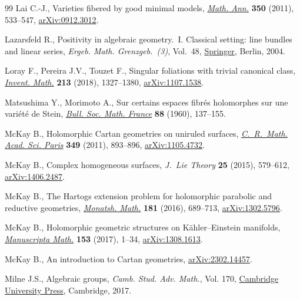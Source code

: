 \documentclass[11pt]{article}
\numberwithin{equation}{section}
\numberwithin{equation}{section}
\begin{document}
\begin{thebibliography}{99}
Lai C.-J., Varieties fibered by good minimal models, \href{https://doi.org/10.1007/s00208-010-0574-7}{\textit{Math. Ann.}}
 \textbf{350} (2011), 533--547, \href{https://arxiv.org/abs/0912.3012}{arXiv:0912.3012}.

Lazarsfeld R., Positivity in algebraic geometry.~{I}. {C}lassical setting: line
 bundles and linear series, \textit{Ergeb. Math. Grenzgeb.~(3)}, Vol.~48,
 \href{https://doi.org/10.1007/978-3-642-18808-4}{Springer}, Berlin, 2004.

Loray F., Pereira J.V., Touzet F., Singular foliations with trivial canonical
 class, \href{https://doi.org/10.1007/s00222-018-0806-0}{\textit{Invent. Math.}} \textbf{213} (2018), 1327--1380,
 \href{https://arxiv.org/abs/1107.1538}{arXiv:1107.1538}.

Matsushima Y., Morimoto A., Sur certains espaces fibr\'es holomorphes sur une
 vari\'et\'e de {S}tein, \href{https://doi.org/10.24033/bsmf.1548}{\textit{Bull. Soc. Math. France}} \textbf{88} (1960),
 137--155.

McKay B., Holomorphic {C}artan geometries on uniruled surfaces,
 \href{https://doi.org/10.1016/j.crma.2011.07.021}{\textit{C.~R.~Math. Acad. Sci. Paris}} \textbf{349} (2011), 893--896,
 \href{https://arxiv.org/abs/1105.4732}{arXiv:1105.4732}.

McKay B., Complex homogeneous surfaces, \textit{J.~Lie Theory} \textbf{25}
 (2015), 579--612, \href{https://arxiv.org/abs/1406.2487}{arXiv:1406.2487}.

McKay B., The {H}artogs extension problem for holomorphic parabolic and
 reductive geometries, \href{https://doi.org/10.1007/s00605-016-0955-4}{\textit{Monatsh. Math.}} \textbf{181} (2016), 689--713,
 \href{https://arxiv.org/abs/1302.5796}{arXiv:1302.5796}.

McKay B., Holomorphic geometric structures on {K}\"ahler--{E}instein manifolds,
 \href{https://doi.org/10.1007/s00229-016-0873-8}{\textit{Manuscripta Math.}} \textbf{153} (2017), 1--34, \href{https://arxiv.org/abs/1308.1613}{arXiv:1308.1613}.

McKay B., An introduction to {C}artan geometries, \href{https://arxiv.org/abs/2302.14457}{arXiv:2302.14457}.

Milne J.S., Algebraic groups, \textit{Camb. Stud. Adv. Math.}, Vol. 170,
 \href{https://doi.org/10.1017/9781316711736}{Cambridge University Press}, Cambridge, 2017.


\end{thebibliography}
\end{document}
